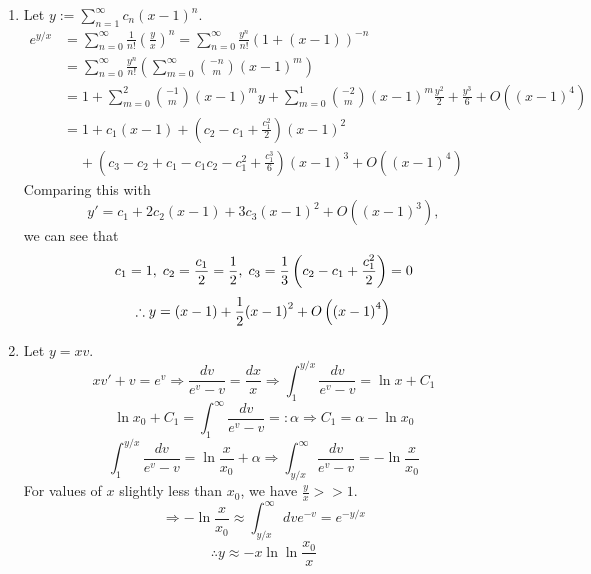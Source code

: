 \item
\begin{enumerate}[wide, labelindent=0pt, label= (\alph*)]
	\item
	      Let $y := \sum_{n=1}^\infty c_n {(x - 1)}^n$.
	      \begin{align*}
		      e^{y/x}
		       & = \sum_{n=0}^\infty \frac{1}{n!} {\left( \frac{y}{x} \right)}^n
		      = \sum_{n=0}^\infty\frac{y^n}{n!} {\left( 1 + \left( x - 1 \right) \right)}^{-n}                \\
		       & = \sum_{n=0}^\infty\frac{y^n}{n!} \left( \sum_{m=0}^\infty \binom{-n}{m} {(x - 1)}^m \right) \\
		       & = 1 + \sum_{m=0}^2 \binom{-1}{m} {(x - 1)}^m y
		      + \sum_{m=0}^1 \binom{-2}{m} {(x - 1)}^m \frac{y^2}{2}
		      + \frac{y^3}{6}
		      + O \left( {(x - 1)}^4 \right)                                                                  \\
		       & = 1 + c_1 (x - 1)
		      + \left( c_2 - c_1 + \frac{c_1^2}{2} \right) {(x - 1)}^2                                        \\
		       & \;\;\;\;+ \left( c_3 - c_2 + c_1 - c_1 c_2 - c_1^2 + \frac{c_1^3}{6} \right) {(x - 1)}^3
		      + O \left( {(x - 1)}^4 \right)
	      \end{align*}
	      Comparing this with
	      \[
		      y' = c_1 + 2c_2 (x - 1) + 3c_3 {(x - 1)}^2 + O \left( {(x - 1)}^3 \right),
	      \]
	      we can see that
	      \[
		      c_1 = 1,\;
		      c_2 = \frac{c_1}{2} = \frac{1}{2},\;
		      c_3 = \frac{1}{3} \left( c_2 - c_1 + \frac{c_1^2}{2} \right) = 0
	      \]
	      \[
		      \therefore y = (x - 1) + \frac{1}{2} {(x - 1)}^2 + O \left( {(x - 1)}^4 \right)
	      \]

	\item
	      Let $y = xv$.
	      \[
		      xv' + v = e^v
		      \Rightarrow \frac{dv}{e^v - v} = \frac{dx}{x}
		      \Rightarrow \int_1^{y/x} \frac{dv}{e^v - v} = \ln x + C_1
	      \]
	      \[
		      \ln x_0 + C_1 = \int_1^\infty \frac{dv}{e^v - v} =: \alpha
		      \Rightarrow C_1 = \alpha - \ln x_0
	      \]
	      \[
		      \int_1^{y/x} \frac{dv}{e^v - v} = \ln \frac{x}{x_0} + \alpha
		      \Rightarrow \int_{y/x}^\infty \frac{dv}{e^v - v} = -\ln \frac{x}{x_0}
	      \]
	      For values of $x$ slightly less than $x_0$, we have $\frac{y}{x} >> 1$.
	      \[
		      \Rightarrow -\ln \frac{x}{x_0} \approx \int_{y/x}^\infty dv e^{-v} = e^{-y/x}
	      \]
	      \[
		      \therefore y \approx -x \ln \ln \frac{x_0}{x}
	      \]

\end{enumerate}